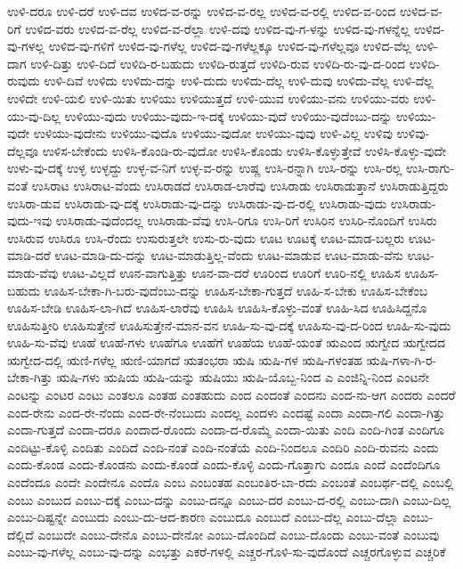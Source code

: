 {ಉಳಿ-ದರೂ
ಉಳಿ-ದರೆ
ಉಳಿ-ದವ
ಉಳಿದ-ವ-ರನ್ನು
ಉಳಿದ-ವ-ರಲ್ಲ
ಉಳಿದ-ವ-ರಲ್ಲಿ
ಉಳಿದ-ವ-ರಿಂದ
ಉಳಿದ-ವ-ರಿಗೆ
ಉಳಿದ-ವರು
ಉಳಿದ-ವ-ರೆಲ್ಲ
ಉಳಿದ-ವ-ರೆಲ್ಲಾ
ಉಳಿ-ದವು
ಉಳಿದ-ವು-ಗ-ಳನ್ನು
ಉಳಿದ-ವು-ಗಳನ್ನೆಲ್ಲ
ಉಳಿದ-ವು-ಗಳಲ್ಲ
ಉಳಿದ-ವು-ಗಳಿಗೆ
ಉಳಿದ-ವು-ಗಳೆಲ್ಲ
ಉಳಿದ-ವು-ಗಳೆಲ್ಲಕ್ಕೂ
ಉಳಿದ-ವು-ಗಳೆಲ್ಲವೂ
ಉಳಿದ-ವೆಲ್ಲ
ಉಳಿ-ದಾಗ
ಉಳಿ-ದಿತ್ತು
ಉಳಿ-ದಿದೆ
ಉಳಿದಿ-ರ-ಬಹುದು
ಉಳಿದಿ-ರುತ್ತದೆ
ಉಳಿದಿ-ರುವ
ಉಳಿದಿ-ರು-ವು-ದ-ರಿಂದ
ಉಳಿದಿ-ರುವುದು
ಉಳಿ-ದಿವೆ
ಉಳಿದು
ಉಳಿದು-ದನ್ನು
ಉಳಿ-ದುದು
ಉಳಿದು-ದೆಲ್ಲ
ಉಳಿ-ದುವು
ಉಳಿದು-ವೆಲ್ಲ
ಉಳಿ-ದೆಲ್ಲ
ಉಳಿದೇ
ಉಳಿ-ಯಲಿ
ಉಳಿ-ಯಿತು
ಉಳಿಯು
ಉಳಿಯುತ್ತದೆ
ಉಳಿ-ಯುವ
ಉಳಿಯು-ವನು
ಉಳಿಯು-ವರು
ಉಳಿ-ಯು-ವು-ದಿಲ್ಲ
ಉಳಿಯು-ವುದು
ಉಳಿಯು-ವುದು-ಇ-ದಕ್ಕೆ
ಉಳಿಯು-ವುದೆ
ಉಳಿಯು-ವುದೆಂಬು-ದನ್ನು
ಉಳಿಯು-ವುದೇ
ಉಳಿಯು-ವುದೇನು
ಉಳಿಯು-ವುದೊ
ಉಳಿಯು-ವುದೋ
ಉಳಿಯು-ವುವು
ಉಳಿ-ವಿಲ್ಲ
ಉಳಿವು
ಉಳಿವು-ದೆಲ್ಲವೂ
ಉಳಿಸ-ಬೇಕೆಂದು
ಉಳಿಸಿ-ಕೊಂಡಿ-ರು-ವುದೋ
ಉಳಿಸಿ-ಕೊಂಡು
ಉಳಿಸಿ-ಕೊಳ್ಳುತ್ತೇವೆ
ಉಳಿಸಿ-ಕೊಳ್ಳು-ವುದೇ
ಉಳು-ವು-ದಕ್ಕೆ
ಉಳ್ಳ
ಉಳ್ಳದ್ದು
ಉಳ್ಳ-ವ-ನಿಗೆ
ಉಳ್ಳ-ವ-ರನ್ನು
ಉಷ್ಣ
ಉಸಿ-ರನ್ನಾಗಿ
ಉಸಿ-ರನ್ನು
ಉಸಿ-ರಲ್ಲ
ಉಸಿ-ರಾಗು-ವಂತೆ
ಉಸಿರಾಟ
ಉಸಿರಾಟ-ವೆಂದು
ಉಸಿರಾಡದೆ
ಉಸಿರಾಡ-ಲಾರೆವು
ಉಸಿರಾಡು
ಉಸಿರಾಡುತ್ತಾನೆ
ಉಸಿರಾಡುತ್ತಿದ್ದರು
ಉಸಿರಾ-ಡುವ
ಉಸಿರಾಡು-ವು-ದಕ್ಕೆ
ಉಸಿರಾಡು-ವು-ದನ್ನು
ಉಸಿರಾಡು-ವು-ದ-ರಲ್ಲಿ
ಉಸಿರಾಡು-ವುದು
ಉಸಿರಾಡು-ವುದು-ಇವು
ಉಸಿರಾಡು-ವುದೆಂದಲ್ಲ
ಉಸಿರಾಡು-ವೆವು
ಉಸಿ-ರಿಗೂ
ಉಸಿ-ರಿಗೆ
ಉಸಿರಿನ
ಉಸಿರಿ-ನೊಂದಿಗೆ
ಉಸಿರು
ಉಸಿರುವ
ಉಸಿರೂ
ಉಸಿ-ರೆಂದು
ಉಸುರುತ್ತಲೇ
ಉಸು-ರು-ವುದು
ಊಟ
ಊಟಕ್ಕೆ
ಊಟ-ಮಾಡ-ಬಲ್ಲರು
ಊಟ-ಮಾಡಿ-ದರೆ
ಊಟ-ಮಾಡಿ-ದು-ದನ್ನು
ಊಟ-ಮಾಡುತ್ತಿಲ್ಲ-ವೆಂದು
ಊಟ-ಮಾಡುವ
ಊಟ-ಮಾಡು-ವೆನು
ಊಟ-ಮಾಡು-ವೆವು
ಊಟ-ವಿಲ್ಲದೆ
ಊನ-ವಾಗುತ್ತಿತ್ತು
ಊನ-ವಾ-ದರೆ
ಊರಿಂದ
ಊರಿಗೆ
ಊರಿ-ನಲ್ಲಿ
ಊಹಿಸ
ಊಹಿಸ-ಬಹುದು
ಊಹಿಸ-ಬೇಕಾ-ಗಿ-ಬರು-ವುದೆಂಬು-ದನ್ನು
ಊಹಿಸ-ಬೇಕಾ-ಗುತ್ತದೆ
ಊಹಿ-ಸ-ಬೇಕು
ಊಹಿಸ-ಬೇಕೆಂಬ
ಊಹಿಸ-ಬೇಡಿ
ಊಹಿಸ-ಲಾ-ಗಿದೆ
ಊಹಿಸ-ಲಾರೆವು
ಊಹಿಸಿ
ಊಹಿಸಿ-ಕೊಳ್ಳು-ವಂತೆ
ಊಹಿ-ಸಿದ
ಊಹಿಸಿದ್ದನೊ
ಊಹಿಸುತ್ತೀರಿ
ಊಹಿಸುತ್ತೇನೆ
ಊಹಿಸುತ್ತೇನೆ-ಮಾನ-ವನ
ಊಹಿ-ಸು-ವು-ದಕ್ಕೆ
ಊಹಿಸು-ವು-ದ-ರಿಂದ
ಊಹಿ-ಸು-ವುದು
ಊಹಿ-ಸು-ವೆವು
ಊಹೆ
ಊಹೆ-ಗಳು
ಊಹೆಗೂ
ಊಹೆಗೆ
ಊಹೆಯ
ಊಹೆ-ಯಂತೆ
ಋಎಂದ
ಋಗ್ವೇದ
ಋಗ್ವೇದದ
ಋಗ್ವೇದ-ದಲ್ಲಿ
ಋಣಿ-ಗಳೆಲ್ಲ
ಋಣಿ-ಯಾಗದೆ
ಋತಂಭರಾ
ಋಷಿ
ಋಷಿ-ಗಳ
ಋಷಿ-ಗಳಂತಹ
ಋಷಿ-ಗಳಾ-ಗಿ-ರ-ಬೇಕಾ-ಗಿತ್ತು
ಋಷಿ-ಗಳು
ಋಷಿಯ
ಋಷಿ-ಯನ್ನು
ಋಷಿಯು
ಋಷಿ-ಯೊಬ್ಬ-ನಿಂದ
ಎ
ಎಂಜಿನ್ನಿ-ನಿಂದ
ಎಂಟನೇ
ಎಂಟನ್ನು
ಎಂಟರ
ಎಂಟು
ಎಂತಲೂ
ಎಂತಹ
ಎಂತಹುದು
ಎಂದ
ಎಂದಂತೆ
ಎಂದನು
ಎಂದ-ನು-ಆಗ
ಎಂದರು
ಎಂದರೆ
ಎಂದ-ರೇನು
ಎಂದ-ರೇ-ನೆಂದು
ಎಂದ-ರೇ-ನೆಂಬುದು
ಎಂದಲ್ಲ
ಎಂದಳು
ಎಂದಷ್ಟೆ
ಎಂದಾ
ಎಂದಾ-ಗಲಿ
ಎಂದಾ-ಗಿತ್ತು
ಎಂದಾ-ಗುತ್ತದೆ
ಎಂದಾ-ದರೂ
ಎಂದಾದ-ರೊಂದು
ಎಂದಾ-ದ-ರೊಮ್ಮೆ
ಎಂದಾ-ಯಿತು
ಎಂದಿ
ಎಂದಿ-ಗಿಂತ
ಎಂದಿಗೂ
ಎಂದಿಟ್ಟು-ಕೊಳ್ಳಿ
ಎಂದಿತು
ಎಂದಿದೆ
ಎಂದಿ-ನಂತೆ
ಎಂದಿ-ನಂತೆಯೆ
ಎಂದಿ-ನಿಂದಲೂ
ಎಂದಿರಿ
ಎಂದಿ-ರುವನು
ಎಂದು
ಎಂದು-ಕೊಂಡ
ಎಂದು-ಕೊಂಡನು
ಎಂದು-ಕೊಂಡೆ
ಎಂದು-ಕೊಳ್ಳಿ
ಎಂದು-ಗೊತ್ತಾಗು
ಎಂದೂ
ಎಂದೆ
ಎಂದೆಂದಿಗೂ
ಎಂದೆಂದೂ
ಎಂದೇ
ಎಂದೇನೂ
ಎಂದೊ
ಎಂಬ
ಎಂಬಂತಹ
ಎಂಬಂತಿರ-ಬಾ-ರದು
ಎಂಬಂತೆ
ಎಂಬರ್ಥ-ದಲ್ಲಿ
ಎಂಬಲ್ಲಿ
ಎಂಬು
ಎಂಬುದ
ಎಂಬು-ದಕ್ಕೆ
ಎಂಬು-ದನ್ನು
ಎಂಬು-ದನ್ನೂ
ಎಂಬು-ದರ
ಎಂಬು-ದ-ರಲ್ಲಿ
ಎಂಬು-ದಾಗಿ
ಎಂಬು-ದಿಲ್ಲ
ಎಂಬು-ದಿಷ್ಟನ್ನೇ
ಎಂಬುದು
ಎಂಬು-ದು-ಆದ-ಕಾರಣ
ಎಂಬುದೂ
ಎಂಬುದೆ
ಎಂಬು-ದೆಲ್ಲ
ಎಂಬು-ದೆಲ್ಲಾ
ಎಂಬು-ದೆಲ್ಲಿದೆ
ಎಂಬುದೇ
ಎಂಬು-ದೇನೊ
ಎಂಬು-ದೇನೋ
ಎಂಬು-ದೊಂದಿದೆ
ಎಂಬು-ದೊಂದು
ಎಂಬು-ವಂತೆ
ಎಂಬುವು
ಎಂಬು-ವು-ಗಳೆಲ್ಲ
ಎಂಬು-ವು-ದನ್ನು
ಎಂಭತ್ತು
ಎಕರೆ-ಗಳಲ್ಲಿ
ಎಚ್ಚರ-ಗೊಳಿ-ಸು-ವುದೊಂದೆ
ಎಚ್ಚರಗೊಳ್ಳುವ
ಎಚ್ಚರಿಕೆ
}
